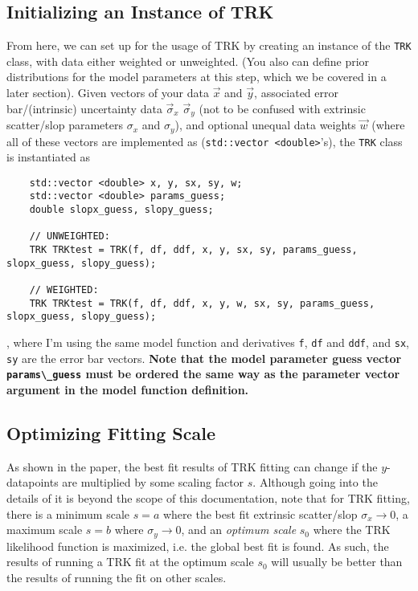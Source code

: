 \documentclass[12pt]{article}
\newcommand{\li}{\lstinline}
\begin{document}
\subsection{Initializing an Instance of TRK}
From here, we can set up for the usage of TRK by creating an instance of the \li{TRK} class, with data either weighted or unweighted. (You also can define prior distributions for the model parameters at this step, which we be covered in a later section). Given vectors of your data $\vec{x}$ and $\vec{y}$, associated error bar/(intrinsic) uncertainty data $\vec{\sigma}_x$ $\vec{\sigma}_y$ (not to be confused with extrinsic scatter/slop parameters $\sigma_x$ and $\sigma_y$), and optional unequal data weights $\vec{w}$ (where all of these vectors are implemented as (\li{std::vector <double>}'s), the \li{TRK} class is instantiated as
\begin{lstlisting}
    std::vector <double> x, y, sx, sy, w;
    std::vector <double> params_guess;
    double slopx_guess, slopy_guess;
    
    // UNWEIGHTED:
    TRK TRKtest = TRK(f, df, ddf, x, y, sx, sy, params_guess, slopx_guess, slopy_guess);

    // WEIGHTED:
    TRK TRKtest = TRK(f, df, ddf, x, y, w, sx, sy, params_guess, slopx_guess, slopy_guess);
\end{lstlisting},
where I'm using the same model function and derivatives \li{f}, \li{df} and \li{ddf}, and \li{sx}, \li{sy} are the error bar vectors. \textbf{Note that the model parameter guess vector \li{params\_guess} must be ordered the same way as the parameter vector argument in the model function definition.}



\subsection{Optimizing Fitting Scale}
As shown in the paper, the best fit results of TRK fitting can change if the $y$-datapoints are multiplied by some scaling factor $s$. Although going into the details of it is beyond the scope of this documentation, note that for TRK fitting, there is a minimum scale $s=a$ where the best fit extrinsic scatter/slop $\sigma_x\rightarrow 0$, a maximum scale $s=b$ where $\sigma_y\rightarrow 0$, and an \textit{optimum scale} $s_0$ where the TRK likelihood function is maximized, i.e. the global best fit is found. As such, the results of running a TRK fit at the optimum scale $s_0$ will usually be better than the results of running the fit on other scales. 
\end{document}
